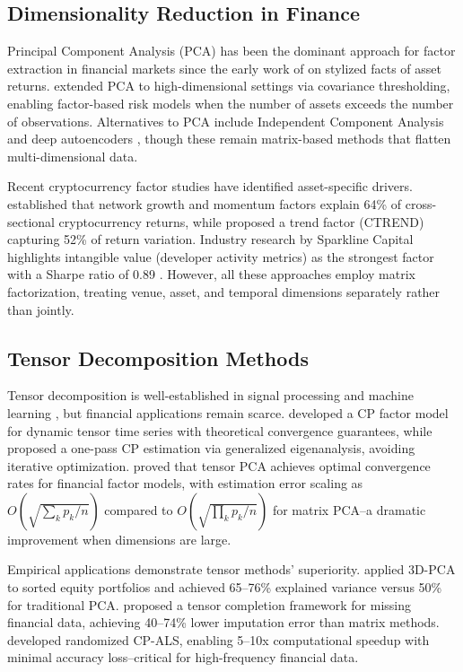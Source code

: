 \documentclass[11pt,twocolumn]{article}
\begin{document}
\subsection{Dimensionality Reduction in Finance}

Principal Component Analysis (PCA) has been the dominant approach for factor extraction in financial markets since the early work of \citet{Cont2001Empirical} on stylized facts of asset returns. \citet{Fan2013Large} extended PCA to high-dimensional settings via covariance thresholding, enabling factor-based risk models when the number of assets exceeds the number of observations. Alternatives to PCA include Independent Component Analysis \citep{Back1997First} and deep autoencoders \citep{Heaton2017Deep}, though these remain matrix-based methods that flatten multi-dimensional data.

Recent cryptocurrency factor studies have identified asset-specific drivers. \citet{Liu2021Risks} established that network growth and momentum factors explain 64\% of cross-sectional cryptocurrency returns, while \citet{Fieberg2023CTREND} proposed a trend factor (CTREND) capturing 52\% of return variation. Industry research by Sparkline Capital highlights intangible value (developer activity metrics) as the strongest factor with a Sharpe ratio of 0.89 \citep{Sparkline2025IntangibleValue}. However, all these approaches employ matrix factorization, treating venue, asset, and temporal dimensions separately rather than jointly.

\subsection{Tensor Decomposition Methods}

Tensor decomposition is well-established in signal processing and machine learning \citep{Kolda2009Tensor,Cichocki2015Tensor}, but financial applications remain scarce. \citet{Han2022CP} developed a CP factor model for dynamic tensor time series with theoretical convergence guarantees, while \citet{Chang2023Modelling} proposed a one-pass CP estimation via generalized eigenanalysis, avoiding iterative optimization. \citet{Babii2023Tensor} proved that tensor PCA achieves optimal convergence rates for financial factor models, with estimation error scaling as $O(\sqrt{\sum_k p_k / n})$ compared to $O(\sqrt{\prod_k p_k / n})$ for matrix PCA--a dramatic improvement when dimensions are large.

Empirical applications demonstrate tensor methods' superiority. \citet{Lettau2024ThreeD} applied 3D-PCA to sorted equity portfolios and achieved 65--76\% explained variance versus 50\% for traditional PCA. \citet{Mo2025ACT} proposed a tensor completion framework for missing financial data, achieving 40--74\% lower imputation error than matrix methods. \citet{Battaglino2018Practical} developed randomized CP-ALS, enabling 5--10x computational speedup with minimal accuracy loss--critical for high-frequency financial data.
\end{document}
